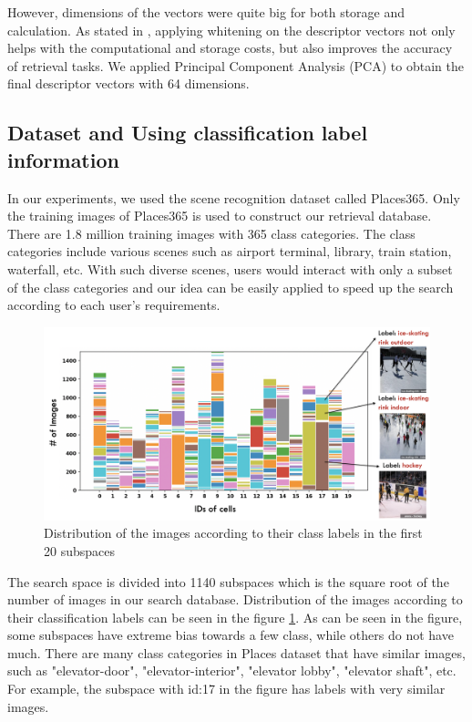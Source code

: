 However, dimensions of the vectors were quite big for both storage and calculation. 
As stated in \cite{jegou2012negative}, applying whitening on the descriptor vectors not only helps with the computational and storage costs, but also improves the accuracy of retrieval tasks.
We applied Principal Component Analysis (PCA) to obtain the final descriptor vectors with 64 dimensions.


\subsection{Dataset and Using classification label information}
\label{retrievallabelinfo}

In our experiments, we used the scene recognition dataset called Places365\cite{zhou2017places}. 
Only the training images of Places365 is used to construct our retrieval database. 
There are 1.8 million training images with 365 class categories. 
The class categories include various scenes such as airport terminal, library, train station, waterfall, etc. 
With such diverse scenes, users would interact with only a subset of the class categories and our idea can be easily applied to speed up the search according to each user's requirements.

\begin{figure}
    \centering
    \includegraphics[width=\textwidth]{thesis/images/label_dist-fig.png}
    \caption{Distribution of the images according to their class labels in the first 20 subspaces}
    \label{fig:label-dist}
\end{figure}

The search space is divided into 1140 subspaces which is the square root of the number of images in our search database. 
Distribution of the images according to their classification labels can be seen in the figure \ref{fig:label-dist}.
As can be seen in the figure, some subspaces have extreme bias towards a few class, while others do not have much. 
There are many class categories in Places dataset that have similar images, such as "elevator-door", "elevator-interior", "elevator lobby", "elevator shaft", etc.
For example, the subspace with id:17 in the figure has labels with very similar images.


